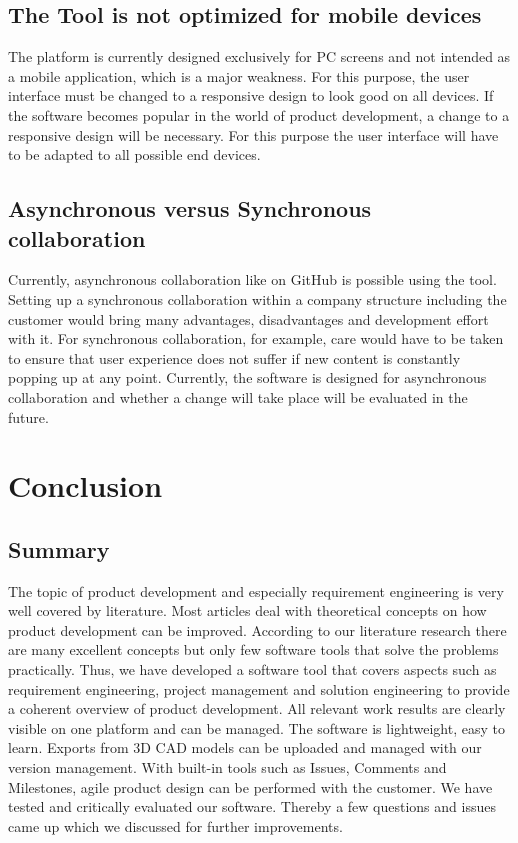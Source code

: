 \subsection*{The Tool is not optimized for mobile devices}
The platform is currently designed exclusively for PC screens and not intended as a mobile application, which is a major weakness. For this purpose, the user interface must be changed to a responsive design to look good on all devices. If the software becomes popular in the world of product development, a change to a responsive design will be necessary. For this purpose the user interface will have to be adapted to all possible end devices.


\subsection*{Asynchronous versus Synchronous collaboration}
Currently, asynchronous collaboration like on GitHub is possible using the tool. Setting up a synchronous collaboration within a company structure including the customer would bring many advantages, disadvantages and development effort with it. For synchronous collaboration, for example, care would have to be taken to ensure that user experience does not suffer if new content is constantly popping up at any point. Currently, the software is designed for asynchronous collaboration and whether a change will take place will be evaluated in the future.



\section{Conclusion}
\label{sec:conclusion}

\subsection*{Summary} 
The topic of product development and especially requirement engineering is very well covered by literature. Most articles deal with theoretical concepts on how product development can be improved. According to our literature research there are many excellent concepts but only few software tools that solve the problems practically. Thus, we have developed a software tool that covers aspects such as requirement engineering, project management and solution engineering to provide a coherent overview of product development. All relevant work results are clearly visible on one platform and can be managed. The software is lightweight, easy to learn. Exports from 3D CAD models can be uploaded and managed with our version management. With built-in tools such as Issues, Comments and Milestones, agile product design can be performed with the customer. We have tested and critically evaluated our software. Thereby a few questions and issues came up which we discussed for further improvements.

